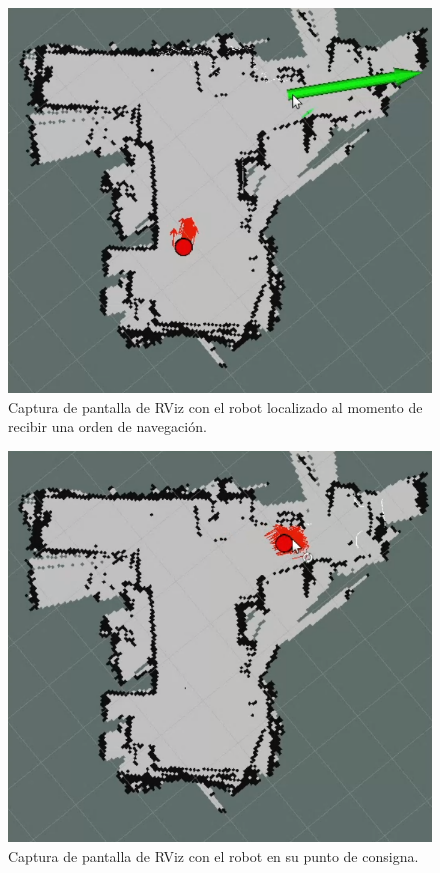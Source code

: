 \begin{figure}[ht]
    \centering
    \includegraphics[scale=0.35]{./Figures/comando_navegacion.png}
    \caption{Captura de pantalla de RViz con el robot localizado al momento de recibir una orden de navegación.}
    \label{fig:comandoNavegación}
\end{figure}


\begin{figure}[ht]
    \centering
    \includegraphics[scale=0.35]{./Figures/robot_en_setpoint.png}
    \caption{Captura de pantalla de RViz con el robot en su punto de consigna.}
    \label{fig:robotEnSetpoint}
\end{figure}